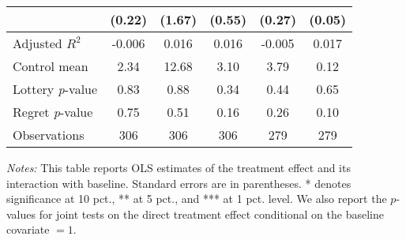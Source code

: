 \begin{table}[htbp]
{\begin{threeparttable}
\begin{tabular}{l*{5}{c}}
                &   (0.22)         &   (1.67)         &   (0.55)         &   (0.27)         &   (0.05)         \\
\midrule
Adjusted \(R^{2}\)&   -0.006         &    0.016         &    0.016         &   -0.005         &    0.017         \\
Control mean    &     2.34         &    12.68         &     3.10         &     3.79         &     0.12         \\
Lottery \emph{p}-value&     0.83         &     0.88         &     0.34         &     0.44         &     0.65         \\
Regret \emph{p}-value&     0.75         &     0.51         &     0.16         &     0.26         &     0.10         \\
Observations    &      306         &      306         &      306         &      279         &      279         \\
\bottomrule \end{tabular} \begin{tablenotes}[flushleft] \footnotesize \item \emph{Notes:} This table reports OLS estimates of the treatment effect and its interaction with baseline. Standard errors are in parentheses. * denotes significance at 10 pct., ** at 5 pct., and *** at 1 pct. level. We also report the \(p\)-values for joint tests on the direct treatment effect conditional on the baseline covariate $= 1$. \end{tablenotes} \end{threeparttable} } \end{table}
